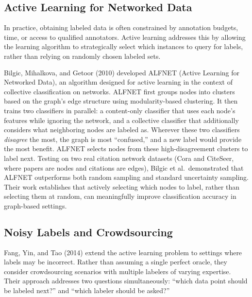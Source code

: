\documentclass{article}
\begin{document}
\subsection{Active Learning for Networked Data}

In practice, obtaining labeled data is often constrained by annotation budgets, time, or access to qualified annotators. Active learning addresses this by allowing the learning algorithm to strategically select which instances to query for labels, rather than relying on randomly chosen labeled sets.

Bilgic, Mihalkova, and Getoor (2010) developed ALFNET (Active Learning for Networked Data), an algorithm designed for active learning in the context of collective classification on networks. ALFNET first groups nodes into clusters based on the graph's edge structure using modularity-based clustering. It then trains two classifiers in parallel: a content-only classifier that uses each node's features while ignoring the network, and a collective classifier that additionally considers what neighboring nodes are labeled as. Wherever these two classifiers \textit{disagree} the most, the graph is most ``confused,'' and a new label would provide the most benefit. ALFNET selects nodes from these high-disagreement clusters to label next. Testing on two real citation network datasets (Cora and CiteSeer, where papers are nodes and citations are edges), Bilgic et al.\ demonstrated that ALFNET outperforms both random sampling and standard uncertainty sampling. Their work establishes that actively selecting which nodes to label, rather than selecting them at random, can meaningfully improve classification accuracy in graph-based settings.

\subsection{Noisy Labels and Crowdsourcing}

Fang, Yin, and Tao (2014) extend the active learning problem to settings where labels may be incorrect. Rather than assuming a single perfect oracle, they consider crowdsourcing scenarios with multiple labelers of varying expertise. Their approach addresses two questions simultaneously: ``which data point should be labeled next?'' and ``which labeler should be asked?''
\end{document}
